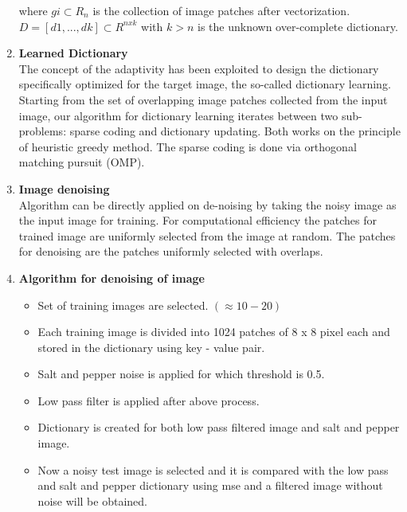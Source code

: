 \documentclass[journal]{IEEEtran}
\begin{document}
\begin{enumerate}
 where $ gi \subset R_n$ is the collection of image patches after vectorization. $D = [d1, . . . , dk] \subset R^{n x k}$ with $ k > n$ is the unknown over-complete dictionary.\\
 
	
	
	\item \textbf{Learned Dictionary}\\
	The concept of the adaptivity has been exploited
to design the dictionary specifically optimized for the target image, the so-called dictionary learning. Starting from the set of overlapping image patches collected from the input image, our algorithm for dictionary learning iterates between two sub-problems: sparse coding and dictionary updating. Both works on the principle of heuristic greedy method. The sparse coding is done via orthogonal matching pursuit (OMP).\\
	    
    \item \textbf{Image denoising}\\
    Algorithm can be directly applied on de-noising by taking the noisy image as the input image for training. For computational efficiency the patches for trained image are uniformly selected from the image at random. The patches for denoising are the patches uniformly selected with overlaps.\\
    
    \item \textbf{Algorithm for denoising of image}\\
    \begin{itemize}
        \item Set of training images are selected. $(\approx 10-20)$
        \item Each training image is divided into 1024 patches of 8 x 8 pixel each and stored in the dictionary using key - value pair.
        \item Salt and pepper noise is applied for which threshold is 0.5.
        \item Low pass filter is applied after above process.
        \item Dictionary is created for both low pass filtered image and salt and pepper image.
        \item Now a noisy test image is selected and it is compared with the low pass and salt and pepper dictionary using mse and a filtered image without noise will be obtained.\\
    \end{itemize}
    

\end{enumerate}
\end{document}
